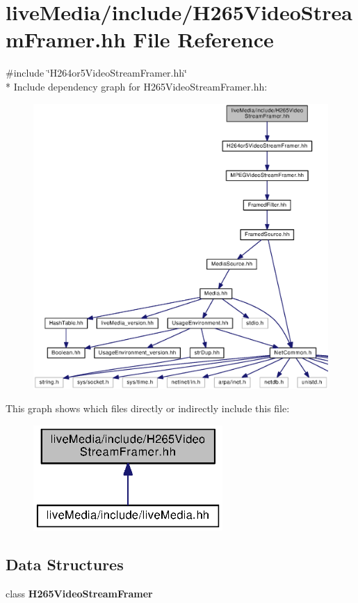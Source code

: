 \section{live\+Media/include/\+H265\+Video\+Stream\+Framer.hh File Reference}
\label{H265VideoStreamFramer_8hh}
{\ttfamily \#include \char`\"{}H264or5\+Video\+Stream\+Framer.\+hh\char`\"{}}\\*
Include dependency graph for H265\+Video\+Stream\+Framer.\+hh\+:
\nopagebreak
\begin{figure}[H]
\begin{center}
\leavevmode
\includegraphics[width=350pt]{H265VideoStreamFramer_8hh__incl}
\end{center}
\end{figure}
This graph shows which files directly or indirectly include this file\+:
\nopagebreak
\begin{figure}[H]
\begin{center}
\leavevmode
\includegraphics[width=204pt]{H265VideoStreamFramer_8hh__dep__incl}
\end{center}
\end{figure}
\subsection*{Data Structures}
\begin{DoxyCompactItemize}
\item 
class {\bf H265\+Video\+Stream\+Framer}
\end{DoxyCompactItemize}
